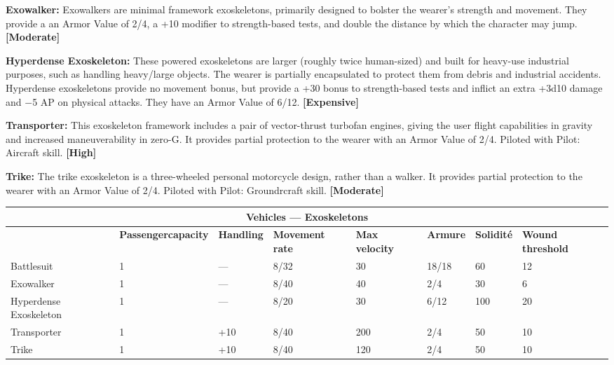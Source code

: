 \textbf{Exowalker:} Exowalkers are minimal framework exoskeletons, primarily designed to bolster the wearer’s strength and movement. They provide a an Armor Value of 2/4, a +10 modifier to strength-based tests, and double the distance by which the character may jump. \textbf{[Moderate]} 

\textbf{Hyperdense Exoskeleton:} These powered exoskeletons are larger (roughly twice human-sized) and built for heavy-use industrial purposes, such as handling heavy/large objects. The wearer is partially encapsulated to protect them from debris and industrial accidents. Hyperdense exoskeletons provide no movement bonus, but provide a +30 bonus to strength-based tests and inflict an extra +3d10 damage and $-$5 AP on physical attacks. They have an Armor Value of 6/12. \textbf{[Expensive]} 

\textbf{Transporter:} This exoskeleton framework includes a pair of vector-thrust turbofan engines, giving the user flight capabilities in gravity and increased maneuverability in zero-G. It provides partial protection to the wearer with an Armor Value of 2/4. Piloted with Pilot: Aircraft skill. \textbf{[High]} 

\textbf{Trike:} The trike exoskeleton is a three-wheeled personal motorcycle design, rather than a walker. It provides partial protection to the wearer with an Armor Value of 2/4. Piloted with Pilot: Groundrcraft skill. \textbf{[Moderate]} 



\begin{table} \begin{tabularx}{\textwidth}{|X|X|X|X|X|X|X|X|} \hline

\multicolumn{8}{|c|}{\textbf{Vehicles --- Exoskeletons}} \\ \hline

&\textbf{Passenger\newline capacity}	&\textbf{Handling}	&\textbf{Movement rate}	&\textbf{Max velocity}	&\textbf{Armure}	&\textbf{Solidité}	&\textbf{Wound threshold} \\ \hline

Battlesuit	&1	&--- &8/32	&30	&18/18	&60	&12 \\ \hline

Exowalker	&1	&--- &8/40	&40	&2/4	&30	&6 \\ \hline

Hyperdense Exoskeleton	&1	&--- &8/20	&30	&6/12	&100	&20 \\ \hline

Transporter	&1	&+10	&8/40	&200	&2/4	&50	&10 \\ \hline

Trike	&1	&+10	&8/40	&120	&2/4	&50	&10 \\ \hline

\end{tabularx} \label{tab:exoskeletons} \end{table} 










